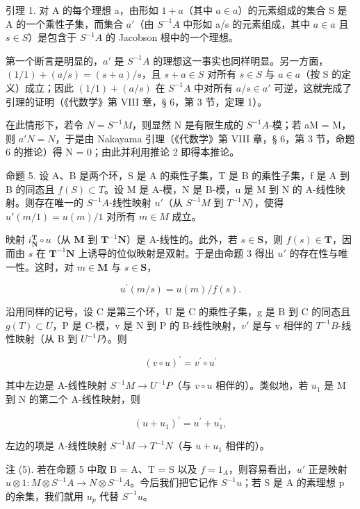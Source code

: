 引理 1. 对 A 的每个理想 a，由形如 \(1 + a\)（其中 \(a \in a\)）的元素组成的集合 S 是 A 的一个乘性子集，而集合 \(a'\)（由 \(S^{-1}A\) 中形如 a/s 的元素组成，其中 \(a \in a\) 且 \(s \in S\)）是包含于 \(S^{-1}A\) 的 Jacobson 根中的一个理想。

第一个断言是明显的，\(a'\) 是 \(S^{-1}A\) 的理想这一事实也同样明显。另一方面，\((1/1) + (a/s) = (s + a)/s\)，且 \(s + a \in S\) 对所有 \(s \in S\) 与 \(a \in a\)（按 S 的定义）成立；因此 \((1/1) + (a/s)\) 在 \(S^{-1}A\) 中对所有 \(a/s \in a'\) 可逆，这就完成了引理的证明（《代数学》第 VIII 章，§ 6，第 3 节，定理 1）。

在此情形下，若令 \(N = S^{-1}M\)，则显然 N 是有限生成的 \(S^{-1}A\)-模；若 aM = M，则 \(a'N = N\)，于是由 Nakayama 引理（《代数学》第 VIII 章，§ 6，第 3 节，命题 6 的推论）得 N = 0；由此并利用推论 2 即得本推论。

命题 5. 设 A、B 是两个环，S 是 A 的乘性子集，T 是 B 的乘性子集，f 是 A 到 B 的同态且 \(f(S) \subset T\)。设 M 是 A-模，N 是 B-模，u 是 M 到 N 的 A-线性映射。则存在唯一的 \(S^{-1}A\)-线性映射 \(u'\)（从 \(S^{-1}M\) 到 \(T^{-1}N\)），使得 \(u'(m/1) = u(m)/1\) 对所有 \(m \in M\) 成立。

映射 \(i_{\mathbf{N}}^{\mathbf{T}} \circ u\)（从 \(\mathbf{M}\) 到 \(\mathbf{T}^{-1}\mathbf{N}\)）是 A-线性的。此外，若 \(s \in \mathbf{S}\)，则 \(f(s) \in \mathbf{T}\)，因而由 \(s\) 在 \(\mathbf{T}^{-1}\mathbf{N}\) 上诱导的位似映射是双射。于是由命题 3 得出 \(u'\) 的存在性与唯一性。这时，对 \(m \in \mathbf{M}\) 与 \(s \in \mathbf{S}\)，

\[
u ^ {\prime} (m / s) = u (m) / f (s).\tag{6}
\]

沿用同样的记号，设 C 是第三个环，U 是 C 的乘性子集，g 是 B 到 C 的同态且 \(g(T) \subset U\)，P 是 C-模，v 是 N 到 P 的 B-线性映射，\(v'\) 是与 v 相伴的 \(T^{-1}B\)-线性映射（从 B 到 \(U^{-1}P\)）。则

\[
(v \circ u) ^ {\prime} = v ^ {\prime} \circ u ^ {\prime}\tag{7}
\]

其中左边是 A-线性映射 \(S^{-1}M \rightarrow U^{-1}P\)（与 \(v \circ u\) 相伴的）。类似地，若 \(u_{1}\) 是 M 到 N 的第二个 A-线性映射，则

\[
(u + u _ {1}) ^ {\prime} = u ^ {\prime} + u _ {1} ^ {\prime},\tag{8}
\]

左边的项是 A-线性映射 \(S^{-1}M \rightarrow T^{-1}N\)（与 \(u + u_{1}\) 相伴的）。

注 (5). 若在命题 5 中取 B = A、T = S 以及 \(f = 1_{A}\)，则容易看出，\(u'\) 正是映射 \(u \otimes 1: M \otimes S^{-1}A \to N \otimes S^{-1}A\)。今后我们把它记作 \(S^{-1}u\)；若 S 是 A 的素理想 p 的余集，我们就用 \(u_{p}\) 代替 \(S^{-1}u\)。

